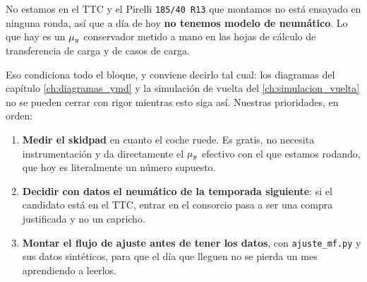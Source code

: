 \begin{caso}
No estamos en el TTC y el Pirelli \texttt{185/40 R13} que montamos no está
ensayado en ninguna ronda, así que a día de hoy \textbf{no tenemos modelo de
neumático}. Lo que hay es un $\mu_y$ conservador metido a mano en las hojas de
cálculo de transferencia de carga y de casos de carga.

Eso condiciona todo el bloque, y conviene decirlo tal cual: los diagramas del
capítulo \ref{ch:diagramas_ymd} y la simulación de vuelta del
\ref{ch:simulacion_vuelta} no se pueden cerrar con rigor mientras esto siga así.
Nuestras prioridades, en orden:

\begin{enumerate}
  \item \textbf{Medir el skidpad} en cuanto el coche ruede. Es gratis, no
        necesita instrumentación y da directamente el $\mu_y$ efectivo con el que
        estamos rodando, que hoy es literalmente un número supuesto.
  \item \textbf{Decidir con datos el neumático de la temporada siguiente}: si el
        candidato está en el TTC, entrar en el consorcio pasa a ser una compra
        justificada y no un capricho.
  \item \textbf{Montar el flujo de ajuste antes de tener los datos}, con
        \texttt{ajuste\_mf.py} y sus datos sintéticos, para que el día que
        lleguen no se pierda un mes aprendiendo a leerlos.
\end{enumerate}

\end{caso}

